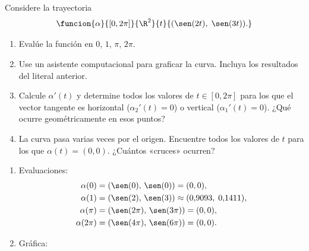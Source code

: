 \documentclass[11pt,respuestas,a4]{aleph-examen}
\begin{document}
\begin{preguntas}

\item
Considere la trayectoria
\[
    \funcion{\alpha}{[0,2\pi]}{\R^2}{t}{(\sen(2t),\;\sen(3t)).}
\]
\begin{enumerate}
    \item Evalúe la función en $0$, $1$, $\pi$, $2\pi$.
    \item Use un asistente computacional para graficar la curva. Incluya los resultados del literal anterior.
    \item Calcule $\alpha'(t)$ y determine todos los valores de $t\in[0,2\pi]$ para los que el vector tangente es horizontal ($\alpha_2'(t)=0$) o vertical ($\alpha_1'(t)=0$). ¿Qué ocurre geométricamente en esos puntos?
    \item La curva pasa varias veces por el origen. Encuentre todos los valores de $t$ para los que $\alpha(t)=(0,0)$. ¿Cuántos «cruces» ocurren?
\end{enumerate}

\begin{respuesta}\hspace{0pt}
\begin{enumerate}
    \item Evaluaciones:
    \begin{align*}
        \alpha(0)&=(\sen(0),\,\sen(0))=(0,0),\\
        \alpha(1)&=(\sen(2),\,\sen(3))\approx(0{,}9093,\;0{,}1411),\\
        \alpha(\pi)&=(\sen(2\pi),\,\sen(3\pi))=(0,0),\\
        \alpha(2\pi)&=(\sen(4\pi),\,\sen(6\pi))=(0,0).
    \end{align*}

    \item Gráfica:
    \begin{center}
    \end{center}


\end{enumerate}
\end{respuesta}
\end{preguntas}
\end{document}
